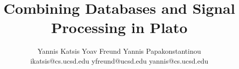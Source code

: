 \documentclass{sig-alternate-cidr}
\newcommand{\projName}{{Plato}}
\begin{document}
\title{Combining Databases and Signal Processing in Plato
}

\author{Yannis Katsis \hspace{1cm} Yoav Freund \hspace{1cm} Yannis Papakonstantinou\\
{\small ikatsis@cs.ucsd.edu \hspace{1cm} yfreund@ucsd.edu \hspace{2cm} yannis@cs.ucsd.edu \hspace*{1cm}}\\\\
\\
}

\maketitle





	



%

%


{%


}
\end{document}
